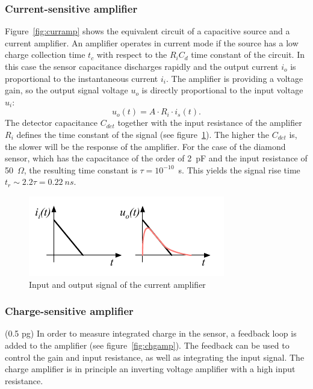 \documentclass[12pt]{mytustyle}  %
\begin{document}
\subsubsection{Current-sensitive amplifier}
Figure~\ref{fig:curramp} shows the equivalent circuit of a capacitive source and a current amplifier. An amplifier operates in current mode if the source has a low charge collection time $t_c$ with respect to the $R_iC_d$ time constant of the circuit. In this case the sensor capacitance discharges rapidly and the output current $i_o$ is proportional to the instantaneous current $i_i$. The amplifier is providing a voltage gain, so the output signal voltage $u_o$ is directly proportional to the input voltage $u_i$:
\begin{equation}
u_o(t) = A \cdot R_i \cdot i_s(t).
\end{equation}
The detector capacitance $C_{det}$ together with the input resistance of the amplifier $R_i$ defines the time constant of the signal (see figure~\ref{fig:currc}). The higher the $C_{det}$ is, the slower will be the response of the amplifier. For the case of the diamond sensor, which has the capacitance of the order of 2~pF and the input resistance of 50~$\Omega$, the resulting time constant is $\tau=10^{-10}$~s. This yields the signal rise time $t_r\sim2.2\tau=0.22~ns$.
\begin{figure}[!t]
\begin{center}
\includegraphics[width=0.45\linewidth]{plots/currrc}
\caption{Input and output signal of the current amplifier}
\label{fig:currc}
\end{center}
\end{figure}




\subsubsection{Charge-sensitive amplifier}
(0.5 pg)
In order to measure integrated charge in the sensor, a feedback loop is added to the amplifier (see figure~\ref{fig:chgamp}). The feedback can be used to control the gain and input resistance, as well as integrating the input signal. The charge amplifier is in principle an inverting voltage amplifier with a high input resistance. 
 
\end{document}
